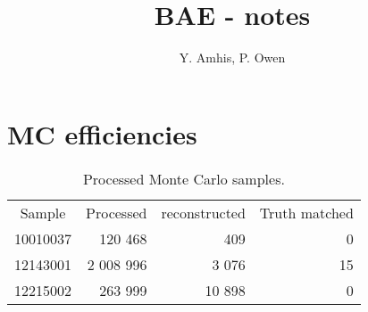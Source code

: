 \documentclass[11pt, oneside]{article}   	%
\title{BAE - notes}
\author{Y. Amhis, P. Owen}
\begin{document}
\maketitle




\section{MC efficiencies}
\begin{table} [h!]
\begin{tabular}{crrr}
Sample & Processed &  reconstructed & Truth matched  \\
10010037 & 120 468& 409 &  0 \\
12143001 & 2 008 996 & 3 076 &  15 \\ 
12215002 &263 999 & 10 898 &  0 \\
\end{tabular}
\caption{ Processed Monte Carlo samples. }
\end{table}
\end{document}
